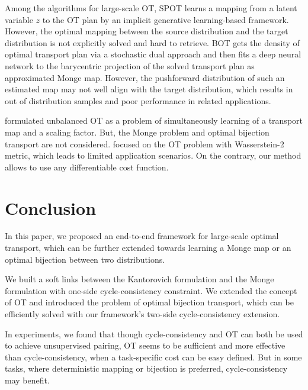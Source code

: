 \documentclass[runningheads]{llncs}
\begin{document}
Among the algorithms for large-scale OT, SPOT \cite{spot} learns a mapping from a latent variable $z$ to the OT plan by an implicit generative learning-based framework. However, the optimal mapping between the source distribution and the target distribution is not explicitly solved and hard to retrieve. BOT \cite{large-scale} gets the density of optimal transport plan via a stochastic dual approach and then fits a deep neural network to the barycentric projection of the solved transport plan as approximated Monge map. However, the pushforward distribution of such an estimated map may not well align with the target distribution, which results in out of distribution samples and poor performance in related applications. 

\cite{scalable_unbalanced_ot} formulated unbalanced OT as a problem of simultaneously learning of a transport map and a scaling factor. But, the Monge problem and optimal bijection transport are not considered. \cite{ot_inputconvex_nn,w2gan_origin} focused on the OT problem with Wasserstein-2 metric, which leads to limited application scenarios. On the contrary, our method allows to use any differentiable cost function. 


\section{Conclusion}

In this paper, we proposed an end-to-end framework for large-scale optimal transport, which can be further extended towards learning a Monge map or an optimal bijection between two distributions. 

We built a soft links between the Kantorovich formulation and the Monge formulation with one-side cycle-consistency constraint. We extended the concept of OT and introduced the problem of optimal bijection transport, which can be efficiently solved with our framework's two-side cycle-consistency extension. 

In experiments, we found that though cycle-consistency and OT can both be used to achieve unsupervised pairing, OT seems to be sufficient and more effective than cycle-consistency, when a task-specific cost can be easy defined. But in some tasks, where deterministic mapping or bijection is preferred, cycle-consistency may benefit. 


%
%


\end{document}
